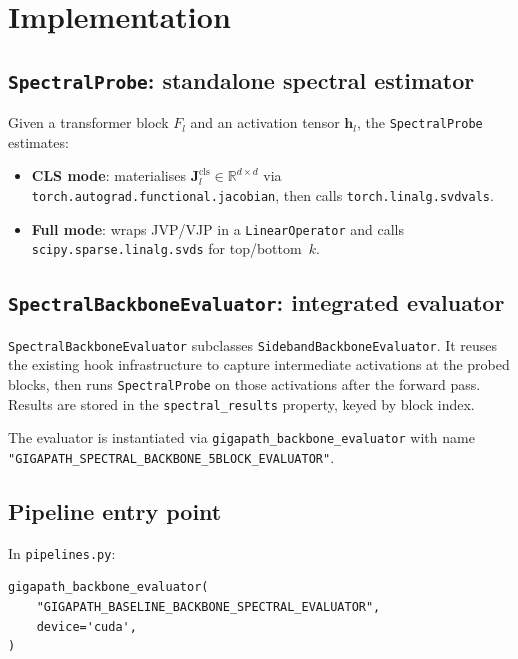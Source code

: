 \documentclass[11pt]{article}
\newcommand{\R}{\mathbb{R}}
\newcommand{\vect}[1]{\bm{#1}}
\newcommand{\mat}[1]{\mathbf{#1}}
\begin{document}
\section{Implementation}

\subsection{\texttt{SpectralProbe}: standalone spectral estimator}

Given a transformer block $F_l$ and an activation tensor
$\vect{h}_l$, the \texttt{SpectralProbe} estimates:

\begin{itemize}
    \item \textbf{CLS mode}: materialises
        $\mat{J}_l^{\text{cls}} \in \R^{d\times d}$ via
        \texttt{torch.autograd.functional.jacobian}, then calls
        \texttt{torch.linalg.svdvals}.
    \item \textbf{Full mode}: wraps JVP/VJP in a
        \texttt{LinearOperator} and calls
        \texttt{scipy.sparse.linalg.svds} for top/bottom~$k$.
\end{itemize}

\subsection{\texttt{SpectralBackboneEvaluator}: integrated evaluator}

\texttt{SpectralBackboneEvaluator} subclasses
\texttt{SidebandBackboneEvaluator}.  It reuses the existing hook
infrastructure to capture intermediate activations at the probed blocks,
then runs \texttt{SpectralProbe} on those activations after the forward
pass.  Results are stored in the \texttt{spectral\_results} property,
keyed by block index.

The evaluator is instantiated via \texttt{gigapath\_backbone\_evaluator}
with name \texttt{"GIGAPATH\_SPECTRAL\_BACKBONE\_5BLOCK\_EVALUATOR"}.


\subsection{Pipeline entry point}

In \texttt{pipelines.py}:

\begin{verbatim}
gigapath_backbone_evaluator(
    "GIGAPATH_BASELINE_BACKBONE_SPECTRAL_EVALUATOR",
    device='cuda',
)
\end{verbatim}
\end{document}
